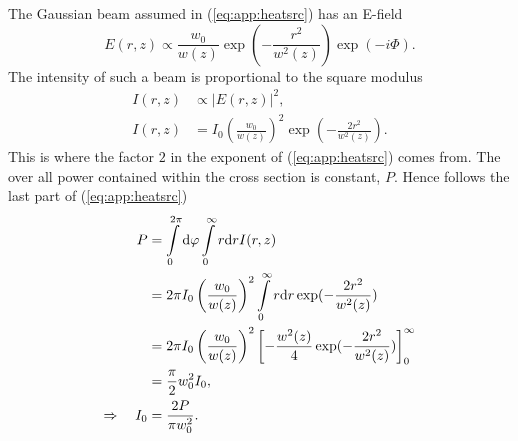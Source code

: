 The Gaussian beam assumed in (\ref{eq:app:heatsrc})
has an E-field \cite{QE}
\begin{equation}
E(r,z) \propto \frac{w_0}{w(z)} \exp(-\frac{r^2}{w^2(z)}) \exp(-i\Phi).
\label{eq:gaussE}
\end{equation}
The intensity of such a beam is proportional to the square modulus
\begin{align}
I(r,z) &\propto |E(r,z)|^2, \\
I(r,z) &= I_0 \left(\frac{w_0}{w(z)}\right)^2 \exp(-\frac{2r^2}{w^2(z)}).
\label{eq:gaussI}
\end{align}
This is where the factor $2$
in the exponent of (\ref{eq:app:heatsrc})
comes from.
The over all power
contained within the cross section
is constant, $P$.
Hence follows
the last part of (\ref{eq:app:heatsrc})
\begin{align}
P &= \int\limits_0^{2\pi}\mathrm{d}\varphi\int\limits_0^\infty r\mathrm{d} r I(r,z) \\
 &= 2\pi I_0 \left(\frac{w_0}{w(z)}\right)^2 \int\limits_0^\infty r \mathrm{d} r \exp(-\frac{2r^2}{w^2(z)}) \\
 &= 2\pi I_0 \left( \frac{w_0}{w(z)}\right)^2 \left[ -\frac{w^2(z)}{4} \exp(-\frac{2r^2}{w^2(z)}) \right]_0^\infty \\
 &= \frac{\pi}{2} w_0^2 I_0, \\
\Rightarrow\quad I_0 &= \frac{2P}{\pi w_0^2}.
\end{align}
